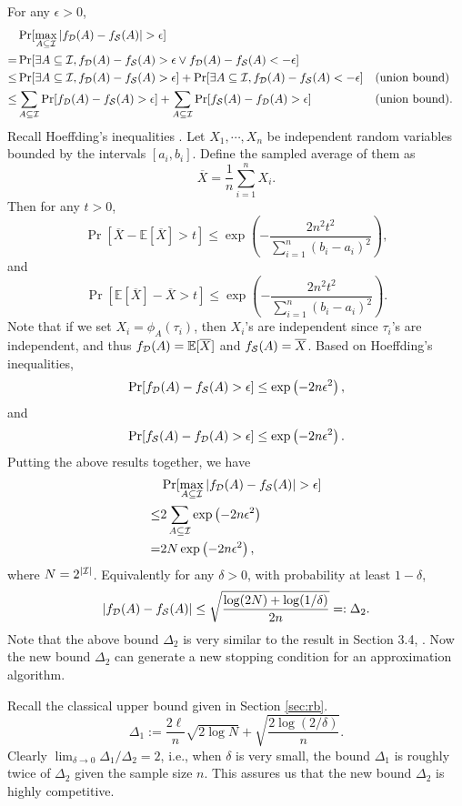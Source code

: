 \documentclass{article}
\begin{document}
For any $\epsilon > 0$,
$$\begin{aligned}
& \Pr[\max_{A\subseteq\I}|f_\D(A)-f_\Smp(A)|>\epsilon] \\
= & \Pr[\exists A\subseteq\I, f_\D(A)-f_\Smp(A)>\epsilon \vee f_\D(A)-f_\Smp(A)<-\epsilon] \\
\leq & \Pr[\exists A\subseteq\I, f_\D(A)-f_\Smp(A)>\epsilon] +\Pr[\exists A\subseteq\I, f_\D(A)-f_\Smp(A)<-\epsilon] && \textrm{(union bound)}\\
\leq & \sum_{A\subseteq\I} \Pr[f_\D(A)-f_\Smp(A)>\epsilon] + \sum_{A\subseteq\I} \Pr[f_\Smp(A)-f_\D(A)>\epsilon] && \textrm{(union bound)}.
\end{aligned}$$
Recall Hoeffding's inequalities \cite{H63}. Let $X_1, \cdots, X_n$ be independent random variables bounded by the intervals $[a_i, b_i]$. Define the sampled average of them as
$$\overline{X} = \frac{1}{n}\sum_{i=1}^n X_i.$$
Then for any $t>0$,
$$\Pr[\overline{X} - \mathbb{E}[\overline{X}] > t] \leq \exp\left(-\frac{2n^2t^2}{\sum_{i=1}^n (b_i-a_i)^2}\right),$$
and
$$\Pr[\mathbb{E}[\overline{X}] - \overline{X} > t] \leq \exp\left(-\frac{2n^2t^2}{\sum_{i=1}^n (b_i-a_i)^2}\right).$$
Note that if we set $X_i = \phi_A(\tau_i)$, then $X_i$'s are independent since $\tau_i$'s are independent, and thus $f_{\mathcal{D}}(A) = \mathbb{E}[\overline{X}]$ and $f_{\mathcal{S}}(A) = \overline{X}$. Based on Hoeffding's inequalities, 
$$\Pr[f_{\mathcal{D}}(A) - f_{\mathcal{S}}(A) > \epsilon] \leq \exp\left(-2n\epsilon^2\right),$$
and
$$\Pr[f_{\mathcal{S}}(A) - f_{\mathcal{D}}(A) > \epsilon] \leq \exp\left(-2n\epsilon^2\right).$$
Putting the above results together, we have
$$\begin{aligned}
& \Pr[\max_{A\subseteq\I}|f_\D(A)-f_\Smp(A)|>\epsilon] \\
\leq & 2\sum_{A\subseteq\I} \exp\left(-2n\epsilon^2\right) \\
= & 2N \exp\left(-2n\epsilon^2\right),
\end{aligned}$$
where $N = 2^{|\mathcal{I}|}$. 
Equivalently for any $\delta>0$, with probability at least $1-\delta$,
$$|f_{\mathcal{D}}(A)-f_{\mathcal{S}}(A)| \leq \sqrt{\frac{\log(2N) + \log(1/\delta)}{2n}} =: \Delta_2.$$
Note that the above bound $\Delta_2$ is very similar to the result in Section 3.4, \cite{BBL04}. Now the new bound $\Delta_2$ can generate a new stopping condition for an approximation algorithm.

Recall the classical upper bound given in Section \ref{sec:rb}.
$$\Delta_1 := \frac{2\ell}{n}\sqrt{2\log N} + \sqrt{\frac{2\log(2/\delta)}{n}}.$$
Clearly $\lim_{\delta\to 0}\Delta_1/\Delta_2 = 2$, i.e., when $\delta$ is very small, the bound $\Delta_1$ is roughly twice of $\Delta_2$ given the sample size $n$.
This assures us that the new bound $\Delta_2$ is highly competitive.
\end{document}
